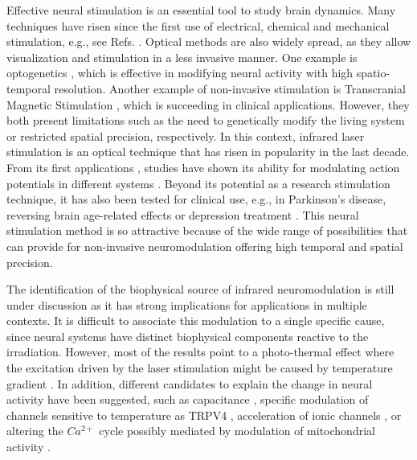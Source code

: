 
Effective neural stimulation is an essential tool to study brain dynamics. Many techniques have risen since the first use of electrical, chemical and mechanical stimulation, e.g., see Refs. \parencite{cogan_neural_2008, chamorro_generalization_2012, carter_guide_2015, bickle_revolutions_2016}. Optical methods are also widely spread, as they allow visualization \parencite{lecoq_wide_2019} and stimulation in a less invasive manner. One example is optogenetics \parencite{boyden_millisecond-timescale_2005, yizhar_optogenetics_2011, tye_optogenetic_2012,bansal_towards_2022}, which is effective in modifying neural activity with high spatio-temporal resolution. Another example of non-invasive stimulation is Transcranial Magnetic Stimulation \parencite{valero-cabre_transcranial_2017}, which is succeeding in clinical applications. However, they both present limitations such as the need to genetically modify the living system or restricted spatial precision, respectively. In this context, infrared laser stimulation is an optical technique that has risen in popularity in the last decade. From its first applications \parencite{wells_application_2005, izzo_optical_2007}, studies have shown its ability for modulating action potentials in different systems \parencite{liang_temperature-dependent_2009, goyal_acute_2012, brown_thermal_2020, barrett_pulsed_2018, shapiro_infrared_2012, cayce_infrared_2014, begeng_activity_2022}. Beyond its potential as a research stimulation technique, it has also been tested for clinical use, e.g., in Parkinson's disease, reversing brain age-related effects or depression treatment \parencite{konstantinovic_transcranial_2013, disner_transcranial_2016, wang_impact_2017, saucedo_transcranial_2021, pan_infrared_2023}. This neural stimulation method is so attractive because of the wide range of possibilities that can provide for non-invasive neuromodulation offering high temporal and spatial precision.

The identification of the biophysical source of infrared neuromodulation is still under discussion as it has strong implications for applications in multiple contexts. It is difficult to associate this modulation to a single specific cause, since neural systems have distinct biophysical components reactive to the irradiation. However, most of the results point to a photo-thermal effect where the excitation driven by the laser stimulation might be caused by temperature gradient \parencite{wells_biophysical_2007}. In addition, different candidates to explain the change in neural activity have been suggested, such as capacitance \parencite{shapiro_infrared_2012, plaksin_thermal_2018}, specific modulation of channels sensitive to temperature as TRPV4 \parencite{albert_trpv4_2012}, acceleration of ionic channels \parencite{liang_temperature-dependent_2009}, or altering the $Ca^{2+}$ cycle possibly mediated by modulation of mitochondrial activity \parencite{dittami_intracellular_2011, lumbreras_pulsed_2014, saucedo_transcranial_2021}.


